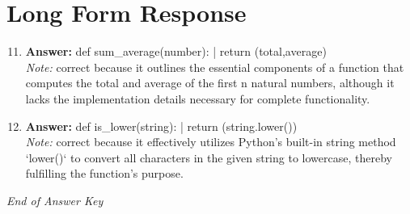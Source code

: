 \documentclass[12pt]{article}
\begin{document}
\section*{Long Form Response}
\begin{enumerate}[label=\arabic*.]
\setcounter{enumi}{10}
\item \textbf{Answer:} def sum\_average(number): | return (total,average)
\\ \textit{Note:} correct because it outlines the essential components of a function that computes the total and average of the first n natural numbers, although it lacks the implementation details necessary for complete functionality.
\item \textbf{Answer:} def is\_lower(string): | return (string.lower())
\\ \textit{Note:} correct because it effectively utilizes Python's built-in string method `lower()` to convert all characters in the given string to lowercase, thereby fulfilling the function's purpose.
\end{enumerate}

\vfill
\noindent\textit{End of Answer Key}
\end{document}
